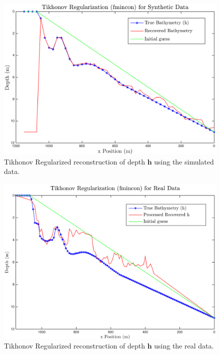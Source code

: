 \begin{figure}[H]
\center
\includegraphics[scale=0.47]{img/fmincon_simulated_25_new.png} %
\caption{Tikhonov Regularized reconstruction of depth $\mathbf{h}$ using the simulated data.}
\label{fmincon_simulated}
\end{figure}

\begin{figure}[H]
\center
\includegraphics[scale=0.46]{img/fmincon_real_data_oct09.png} %
\caption{Tikhonov Regularized reconstruction of depth $\mathbf{h}$ using the real data.}
\label{fmincon_simulated}
\end{figure}




